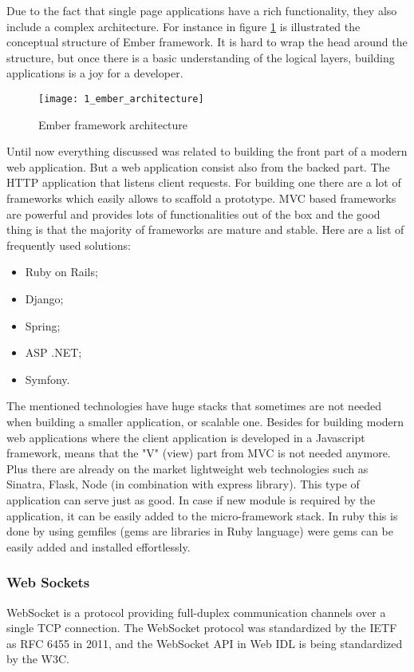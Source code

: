 Due to the fact that single page applications have a rich functionality, they also include a complex architecture. For instance in figure \mbox{\ref{ember_architecture}} is illustrated the conceptual structure of Ember framework. It is hard to wrap the head around the structure, but once there is a basic understanding of the logical layers, building applications is a joy for a developer.

\begin{figure}[!ht]
\centering
\texttt{[image: 1\_ember\_architecture]}
\caption{Ember framework architecture}\label{ember_architecture}
\end{figure}

Until now everything discussed was related to building the front part of a modern web application. But a web application consist also from the backed part. The HTTP application that listens client requests. For building one there are a lot of frameworks which easily allows to scaffold a prototype. MVC based frameworks are powerful and provides lots of functionalities out of the box and the good thing is that the majority of frameworks are mature and stable. Here are a list of frequently used solutions:
\begin{itemize}
    \item Ruby on Rails;
    \item Django;
    \item Spring;
    \item ASP .NET;
    \item Symfony.
\end{itemize}

The mentioned technologies have huge stacks that sometimes are not needed when building a smaller application, or scalable one. Besides for building modern web applications where the client application is developed in a Javascript framework, means that the "V" (view) part from MVC is not needed anymore. Plus there are already on the market lightweight web technologies such as Sinatra, Flask, Node (in combination with express library). This type of application can serve just as good. In case if new module is required by the application, it can be easily added to the micro-framework stack. In ruby this is done by using gemfiles (gems are libraries in Ruby language) were gems can be easily added and installed effortlessly.

\subsubsection{Web Sockets}
WebSocket is a protocol providing full-duplex communication channels over a single TCP connection. The WebSocket protocol was standardized by the IETF as RFC 6455 in 2011, and the WebSocket API in Web IDL is being standardized by the W3C.


